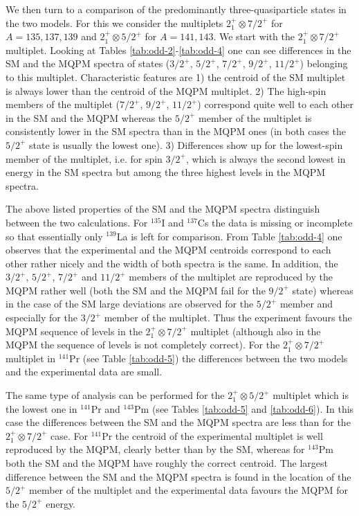 We then turn to a comparison of the predominantly three-quasiparticle 
states in the two models. For this we consider the multiplets
$2^+_1\otimes 7/2^+$ for $A=135,137,139$ and $2^+_1\otimes 5/2^+$ 
for $A=141,143$. We start with the $2^+_1\otimes 7/2^+$ 
multiplet. Looking at Tables \ref{tab:odd-2}-\ref{tab:odd-4} one can 
see differences in the SM and the MQPM spectra of states ($3/2^+$,
$5/2^+$, $7/2^+$, $9/2^+$, $11/2^+$) belonging to this multiplet.
Characteristic features are 1) the centroid of the SM
multiplet is always lower than the centroid of the MQPM multiplet.
2) The high-spin members of the multiplet ($7/2^+$, $9/2^+$, $11/2^+$) 
correspond quite well to each other in the SM and the MQPM whereas the
$5/2^+$ member of the multiplet is consistently lower in the SM spectra
than in the MQPM ones (in both cases the $5/2^+$ state is usually the
lowest one). 3) Differences show up for the lowest-spin member of the 
multiplet, i.e. for spin $3/2^+$, which is always the second lowest in 
energy in the SM spectra but among the three highest levels in the MQPM 
spectra.

The above listed properties of the SM and the MQPM spectra distinguish 
between the two calculations. For $^{135}$I and $^{137}$Cs the data is missing
or incomplete so that essentially only $^{139}$La is left for comparison. From
Table \ref{tab:odd-4} one observes that the experimental and the MQPM centroids
correspond to each other rather nicely and the width of both spectra is the 
same. In addition, the $3/2^+$, $5/2^+$, $7/2^+$ and $11/2^+$ members of the
multiplet are reproduced by the MQPM rather well (both the SM and the 
MQPM fail for the $9/2^+$ state) whereas in the case of the SM large 
deviations are observed for the $5/2^+$ member and especially for the
$3/2^+$ member of the multiplet. Thus the experiment favours the
MQPM sequence of levels in the $2^+_1\otimes 7/2^+$ multiplet (although
also in the MQPM the sequence of levels is not completely correct).
For the $2^+_1\otimes 7/2^+$ multiplet in $^{141}$Pr (see Table 
\ref{tab:odd-5}) the differences between the two models and the experimental 
data are small.

The same type of analysis can be performed for the $2^+_1\otimes 5/2^+$ 
multiplet which is the lowest one in $^{141}$Pr and $^{143}$Pm (see Tables
\ref{tab:odd-5} and \ref{tab:odd-6}). In this case the differences between 
the SM and the MQPM spectra are less than for the $2^+_1\otimes 7/2^+$ case. 
For $^{141}$Pr the centroid of the experimental multiplet is well reproduced
by the MQPM, clearly better than by the SM, whereas for $^{143}$Pm both
the SM and the MQPM have roughly the correct centroid. The largest
difference between the SM and the MQPM spectra is found in the location of
the $5/2^+$ member of the multiplet and the experimental data favours the
MQPM for the $5/2^+$ energy.


